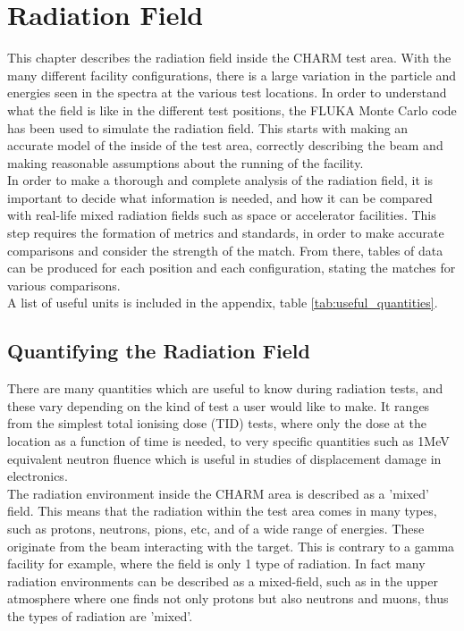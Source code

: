 %

\section{Radiation Field}

This chapter describes the radiation field inside the CHARM test area. With the many different facility configurations, there is a large variation in the particle and energies seen in the spectra at the various test locations. In order to understand what the field is like in the different test positions, the FLUKA Monte Carlo code has been used to simulate the radiation field. This starts with making an accurate model of the inside of the test area, correctly describing the beam and making reasonable assumptions about the running of the facility. \\

In order to make a thorough and complete analysis of the radiation field, it is important to decide what information is needed, and how it can be compared with real-life mixed radiation fields such as space or accelerator facilities. This step requires the formation of metrics and standards, in order to make accurate comparisons and consider the strength of the match. From there, tables of data can be produced for each position and each configuration, stating the matches for various comparisons. \\

A list of useful units is included in the appendix, table \ref{tab:useful_quantities}. \\

\subsection{Quantifying the Radiation Field}

There are many quantities which are useful to know during radiation tests, and these vary depending on the kind of test a user would like to make. It ranges from the simplest total ionising dose (TID) tests, where only the dose at the location as a function of time is needed, to very specific quantities such as 1MeV equivalent neutron fluence which is useful in studies of displacement damage in electronics. \\

The radiation environment inside the CHARM area is described as a 'mixed' field. This means that the radiation within the test area comes in many types, such as protons, neutrons, pions, etc, and of a wide range of energies. These originate from the beam interacting with the target. This is contrary to a gamma facility for example, where the field is only 1 type of radiation. In fact many radiation environments can be described as a mixed-field, such as in the upper atmosphere where one finds not only protons but also neutrons and muons, thus the types of radiation are 'mixed'. \\

